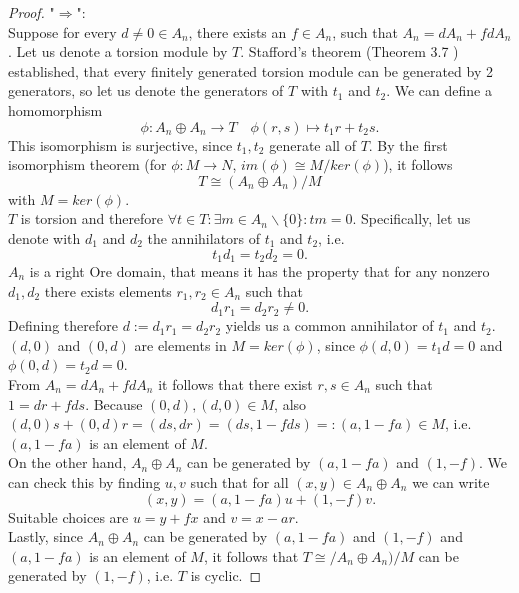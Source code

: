 \documentclass[11pt]{amsart}
\theoremstyle{definition}
\begin{document}
\begin{proof}
   "$\Rightarrow$": \\
        Suppose for every $d\neq 0 \in A_n$, there exists an $f \in A_n$, such that $A_n = dA_n + fdA_n$. Let us denote a torsion module by $T$. Stafford's theorem (Theorem 3.7 \cite[p.~438]{Stafford1978}) established, that every finitely generated torsion module can be generated by 2 generators, so let us denote the generators of $T$ with $t_1$ and $t_2$. We can define a homomorphism 
        \begin{equation}
            \phi:A_n \oplus A_n\rightarrow T \quad \phi(r,s)\mapsto t_1r+t_2s.
        \end{equation}
        This isomorphism is surjective, since $t_1, t_2$ generate all of $T$. By the first isomorphism theorem (for $\phi:M\rightarrow N$, $im(\phi) \cong M/ker(\phi)$), it follows 
        \[T \cong (A_n\oplus A_n)/M\]
        with $M = ker(\phi)$. \\
        $T$ is torsion and therefore $\forall t\in T: \exists m \in A_n\backslash\{0\}: tm = 0.$ Specifically, let us denote with $d_1$ and $d_2$ the annihilators of $t_1$ and $t_2$, i.e.
        \[t_1d_1 = t_2d_2 = 0.\]
        $A_n$ is a right Ore domain, that means it has the property that for any nonzero $d_1, d_2$ there exists elements $r_1, r_2 \in A_n$ such that 
        \[d_1r_1 = d_2r_2 \neq 0.\]
        Defining therefore $d := d_1r_1 = d_2r_2$ yields us a common annihilator of $t_1$ and $t_2$.\\
        $(d, 0)$ and $(0,d)$ are elements in $M = ker(\phi)$, since $\phi(d, 0) = t_1d = 0$ and $\phi(0, d) = t_2d = 0.$\\
        From $A_n = dA_n + fdA_n$ it follows that there exist $r,s \in A_n$ such that $1 = dr + fds$. Because $(0,d), (d, 0) \in M$, also 
        $(d, 0)s + (0, d)r = (ds, dr) = (ds, 1-fds) =: (a, 1-fa) \in M$, i.e. $(a, 1-fa)$ is an element of $M$. \\
        On the other hand, $A_n\oplus A_n$ can be generated by $(a, 1-fa)$ and $(1, -f)$. We can check this by finding $u,v$ such that for all $(x,y)\in A_n\oplus A_n$ we can write 
        \[(x,y) = (a, 1-fa)u + (1, -f)v.\]
        Suitable choices are $u = y+fx$ and $v = x-ar$.\\
        Lastly, since  $A_n\oplus A_n$ can be generated by $(a, 1-fa)$ and $(1, -f)$ and $(a, 1-fa)$ is an element of $M$, it follows that $T \cong /A_n\oplus A_n)/M$ can be generated by $(1, -f)$, i.e. $T$ is cyclic. 
\end{proof}
\end{document}
